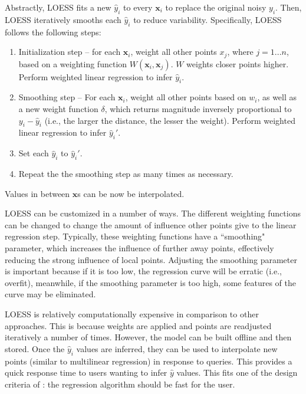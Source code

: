 Abstractly, LOESS fits a new $\hat y_i$ to every $\mathbf x_i$ to replace the original noisy $y_i$.
Then, LOESS iteratively smooths each $\hat y_i$ to reduce variability.
Specifically, LOESS follows the following steps:
\begin{enumerate}
   \item Initialization step -- for each $\mathbf x_i$, weight all other points $x_j$, where $j = 1...n$, based on a weighting function $W(\mathbf x_i, \mathbf x_j)$. $W$ weights closer points higher. Perform weighted linear regression to infer $\hat y_i$.
   \item Smoothing step -- For each $\mathbf x_i$, weight all other points based on $w_i$, as well as a new weight function $\delta$, which returns magnitude inversely proportional to $y_i - \hat y_i$ (i.e., the larger the distance, the lesser the weight). Perform weighted linear regression to infer $\hat y_i'$.
   \item Set each $\hat y_i$ to $\hat y_i'$.
   \item Repeat the the smoothing step as many times as necessary.
\end{enumerate}
Values in between $\mathbf x$s can be now be interpolated.

LOESS can be customized in a number of ways.
The different weighting functions can be changed to change the amount of influence other points give to the linear regression step.
Typically, these weighting functions have a ``smoothing" parameter, which increases the influence of further away points, effectively reducing the strong influence of local points.
Adjusting the smoothing parameter is important because if it is too low, the regression curve will be erratic (i.e., overfit), meanwhile, if the smoothing parameter is too high, some features of the curve may be eliminated.

LOESS is relatively computationally expensive in comparison to other approaches.
This is because  weights are applied and points are readjusted iteratively a number of times.
However, the model can be built offline and then stored.
Once the $\hat y_i$ values are inferred, they can be used to interpolate new points (similar to multilinear regression) in response to queries.
This provides a quick response time to users wanting to infer $\hat y$ values.
This fits one of the design criteria of \fw: the regression algorithm should be fast for the user.

